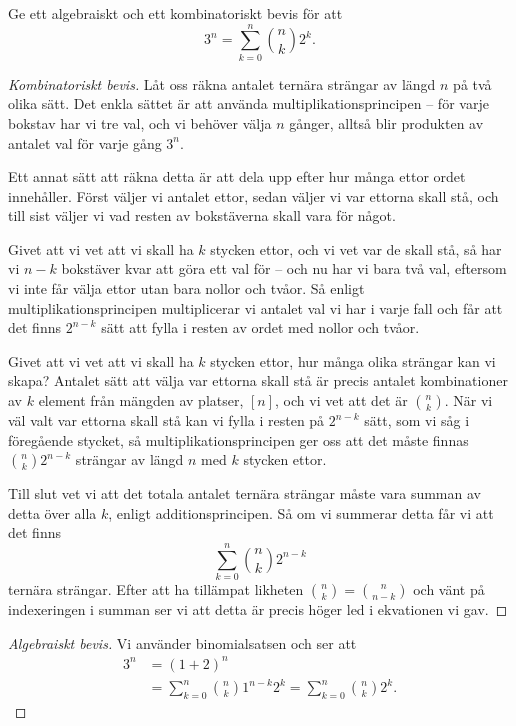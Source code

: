 \documentclass[nobib]{tufte-handout}
\begin{document}
\begin{example}
  Ge ett algebraiskt och ett kombinatoriskt bevis för att
  $$3^n = \sum_{k=0}^n \binom{n}{k}2^k.$$

  \begin{proof}[Kombinatoriskt bevis]
    Låt oss räkna antalet ternära strängar av längd $n$ på två olika sätt. Det enkla sättet är att använda multiplikationsprincipen -- för varje bokstav har vi tre val, och vi behöver välja $n$ gånger, alltså blir produkten av antalet val för varje gång $3^n$.

    Ett annat sätt att räkna detta är att dela upp efter hur många ettor ordet innehåller. Först väljer vi antalet ettor, sedan väljer vi var ettorna skall stå, och till sist väljer vi vad resten av bokstäverna skall vara för något.

    Givet att vi vet att vi skall ha $k$ stycken ettor, och vi vet var de skall stå, så har vi $n-k$ bokstäver kvar att göra ett val för -- och nu har vi bara två val, eftersom vi inte får välja ettor utan bara nollor och tvåor. Så enligt multiplikationsprincipen multiplicerar vi antalet val vi har i varje fall och får att det finns $2^{n-k}$ sätt att fylla i resten av ordet med nollor och tvåor.

    Givet att vi vet att vi skall ha $k$ stycken ettor, hur många olika strängar kan vi skapa? Antalet sätt att välja var ettorna skall stå är precis antalet kombinationer av $k$ element från mängden av platser, $[n]$, och vi vet att det är $\binom{n}{k}$. När vi väl valt var ettorna skall stå kan vi fylla i resten på $2^{n-k}$ sätt, som vi såg i föregående stycket, så multiplikationsprincipen ger oss att det måste finnas $\binom{n}{k}2^{n-k}$ strängar av längd $n$ med $k$ stycken ettor.

    Till slut vet vi att det totala antalet ternära strängar måste vara summan av detta över alla $k$, enligt additionsprincipen. Så om vi summerar detta får vi att det finns
    $$\sum_{k=0}^n \binom{n}{k}2^{n-k}$$
    ternära strängar. Efter att ha tillämpat likheten $\binom{n}{k} = \binom{n}{n-k}$ och vänt på indexeringen i summan ser vi att detta är precis höger led i ekvationen vi gav.
  \end{proof}

  \begin{proof}[Algebraiskt bevis]
    Vi använder binomialsatsen och ser att
    \begin{align*}
      3^n &= (1+2)^n\\
      &= \sum_{k=0}^n \binom{n}{k}1^{n-k}2^k = \sum_{k=0}^n \binom{n}{k}2^k.
    \end{align*}
  \end{proof}
\end{example}
\end{document}

